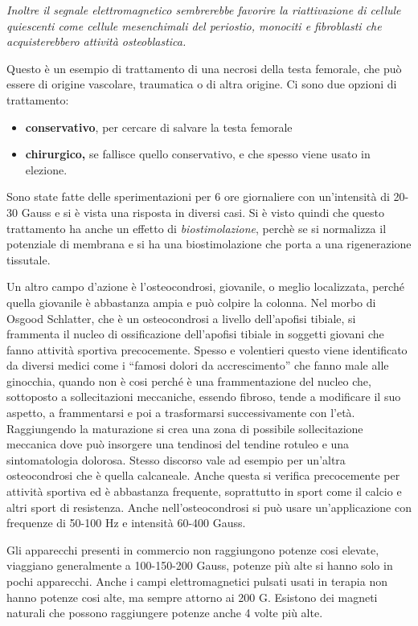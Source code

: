 \documentclass[]{article}
\begin{document}
\emph{Inoltre il segnale elettromagnetico sembrerebbe favorire la
riattivazione di cellule quiescenti come cellule mesenchimali del
periostio, monociti e fibroblasti che acquisterebbero attività
osteoblastica.}

Questo è un esempio di trattamento di una necrosi della testa femorale,
che può essere di origine vascolare, traumatica o di altra origine. Ci
sono due opzioni di trattamento:

\begin{itemize}
\item
  \textbf{conservativo}, per cercare di salvare la testa femorale
\item
  \textbf{chirurgico,} se fallisce quello conservativo, e che spesso
  viene usato in elezione.
\end{itemize}

Sono state fatte delle sperimentazioni per 6 ore giornaliere con
un'intensità di 20-30 Gauss e si è vista una risposta in diversi casi.
Si è visto quindi che questo trattamento ha anche un effetto di
\emph{biostimolazione}, perchè se si normalizza il potenziale di
membrana e si ha una biostimolazione che porta a una rigenerazione
tissutale.

Un altro campo d'azione è l'osteocondrosi, giovanile, o meglio
localizzata, perché quella giovanile è abbastanza ampia e può colpire la
colonna. Nel morbo di Osgood Schlatter, che è un osteocondrosi a livello
dell'apofisi tibiale, si frammenta il nucleo di ossificazione
dell'apofisi tibiale in soggetti giovani che fanno attività sportiva
precocemente. Spesso e volentieri questo viene identificato da diversi
medici come i ``famosi dolori da accrescimento'' che fanno male alle
ginocchia, quando non è cosi perché è una frammentazione del nucleo che,
sottoposto a sollecitazioni meccaniche, essendo fibroso, tende a
modificare il suo aspetto, a frammentarsi e poi a trasformarsi
successivamente con l'età. Raggiungendo la maturazione si crea una zona
di possibile sollecitazione meccanica dove può insorgere una tendinosi
del tendine rotuleo e una sintomatologia dolorosa. Stesso discorso vale
ad esempio per un'altra osteocondrosi che è quella calcaneale. Anche
questa si verifica precocemente per attività sportiva ed è abbastanza
frequente, soprattutto in sport come il calcio e altri sport di
resistenza. Anche nell'osteocondrosi si può usare un'applicazione con
frequenze di 50-100 Hz e intensità 60-400 Gauss.

Gli apparecchi presenti in commercio non raggiungono potenze cosi
elevate, viaggiano generalmente a 100-150-200 Gauss, potenze più alte si
hanno solo in pochi apparecchi. Anche i campi elettromagnetici pulsati
usati in terapia non hanno potenze cosi alte, ma sempre attorno ai 200
G. Esistono dei magneti naturali che possono raggiungere potenze anche 4
volte più alte.
\end{document}
